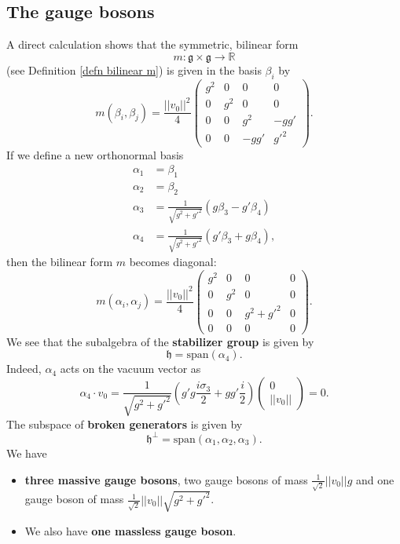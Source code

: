 \documentclass[12pt]{amsart}
\theoremstyle{definition}
\theoremstyle{remark}
\numberwithin{equation}{section}
\begin{document}
\subsection{The gauge bosons}
A direct calculation shows that the symmetric, bilinear form 
\begin{equation*}
m\colon\mathfrak{g}\times\mathfrak{g}\longrightarrow\mathbb{R}
\end{equation*}
(see Definition \ref{defn bilinear m}) is given in the basis $\beta_i$ by 
\begin{equation*}
m(\beta_i,\beta_j)=\frac{||v_0||^2}{4}\left(\begin{array}{cccc}g^2&0&0&0\\0&g^2&0&0\\0&0&g^2&-gg'\\0&0&-gg'&g'^2\end{array}\right).
\end{equation*}
If we define a new orthonormal basis
\begin{align*}
\alpha_1&=\beta_1\\
\alpha_2&=\beta_2\\
\alpha_3&=\frac{1}{\sqrt{g^2+g'^2}}(g\beta_3-g'\beta_4)\\
\alpha_4&=\frac{1}{\sqrt{g^2+g'^2}}(g'\beta_3+g\beta_4),
\end{align*}
then the bilinear form $m$ becomes diagonal:
\begin{equation*}
m(\alpha_i,\alpha_j)=\frac{||v_0||^2}{4}\left(\begin{array}{cccc}g^2&0&0&0\\0&g^2&0&0\\0&0&g^2+g'^2&0\\0&0&0&0\end{array}\right).
\end{equation*}
We see that the subalgebra of the {\bf stabilizer group} is given by 
\begin{equation*}
\mathfrak{h}=\mathrm{span}(\alpha_4).
\end{equation*}
Indeed, $\alpha_4$ acts on the vacuum vector as 
\begin{equation*}
\alpha_4\cdot v_0=\frac{1}{\sqrt{g^2+g'^2}}\left(g'g\frac{i\sigma_3}{2}+gg'\frac{i}{2}\right)\left(\begin{array}{c}0\\||v_0||\end{array}\right)=0.
\end{equation*}
The subspace of {\bf broken generators} is given by 
\begin{equation*}
\mathfrak{h}^\perp=\mathrm{span}(\alpha_1,\alpha_2,\alpha_3).
\end{equation*}
We have 
\begin{itemize}
\item {\bf three massive gauge bosons}, two gauge bosons of mass $\frac{1}{\sqrt{2}}||v_0||g$ and one gauge boson of mass $\frac{1}{\sqrt{2}}||v_0||\sqrt{g^2+g'^2}$.
\item We also have {\bf one massless gauge boson}.
\end{itemize}
\end{document}
